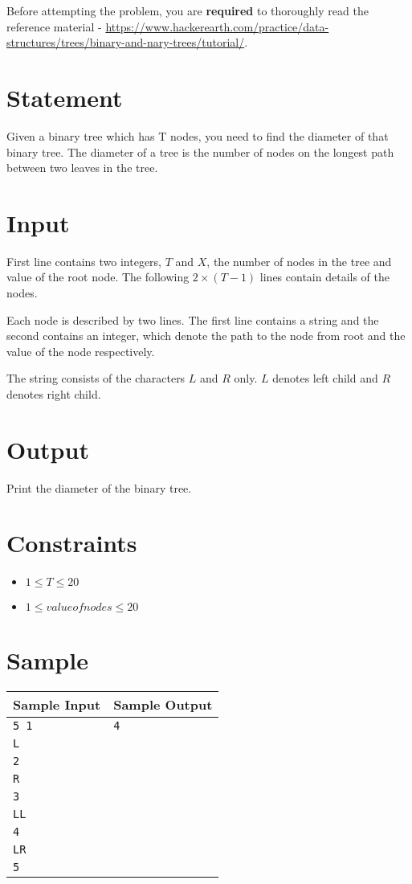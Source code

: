 \documentclass{article}
\begin{document}
Before attempting the problem, you are \textbf{required} to thoroughly read the reference material - \url{https://www.hackerearth.com/practice/data-structures/trees/binary-and-nary-trees/tutorial/}.

\section*{Statement}

Given a binary tree which has T nodes, you need to find the diameter of that binary tree. The diameter of a tree is the number of nodes on the longest path between two leaves in the tree.

\section*{Input}

First line contains two integers, $T$ and $X$, the number of nodes in the tree and value of the root node. The following $2 \times (T - 1)$ lines contain details of the nodes.

Each node is described by two lines. The first line contains a string and the second contains an integer, which denote the path to the node from root and the value of the node respectively.

The string consists of the characters $L$ and $R$ only. $L$ denotes left child and $R$ denotes right child.

\section*{Output}

Print the diameter of the binary tree.

\section*{Constraints}

\begin{itemize}
    \item $1 \le T \le 20$
    \item $1 \le valueofnodes \le 20$
\end{itemize}

\section*{Sample}

\begin{tabular}{l|l}
    \hline
    \hline
    Sample Input & Sample Output \\
    \hline
    \verb+5 1+ & \verb+4+ \\
    \verb+L+ & \verb++ \\
    \verb+2+ & \verb++ \\
    \verb+R+ & \verb++ \\
    \verb+3+ & \verb++ \\
    \verb+LL+ & \verb++ \\
    \verb+4+ & \verb++ \\
    \verb+LR+ & \verb++ \\
    \verb+5+ & \verb++ \\
    \hline
\end{tabular}
\end{document}
